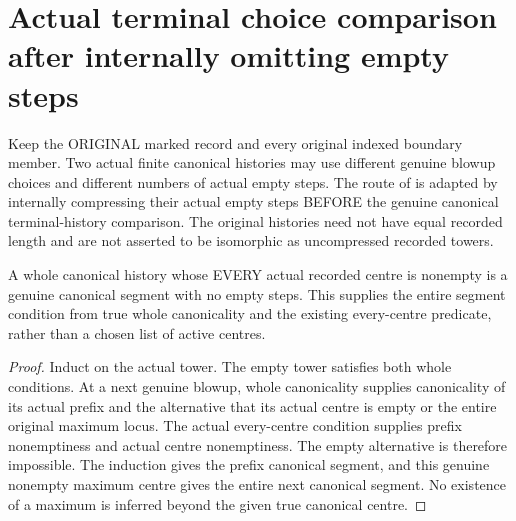 \section{Actual terminal choice comparison after internally omitting empty steps}

Keep the ORIGINAL marked record and every original indexed boundary member.
Two actual finite canonical histories may use different genuine blowup
choices and different numbers of actual empty steps. The route of
\cite{wlodarczyk05-hironaka,bierstone-milman08-functoriality} is adapted by
internally compressing their actual empty steps BEFORE the genuine
canonical terminal-history comparison. The original histories need not
have equal recorded length and are not asserted to be isomorphic as
uncompressed recorded towers.

\begin{lemma}
\label{hir:original-actual-nonempty-canonical-segment}
\leanok
A whole canonical history whose EVERY actual recorded centre is nonempty
is a genuine canonical segment with no empty steps. This supplies the
entire segment condition from true whole canonicality and the existing
every-centre predicate, rather than a chosen list of active centres.
\end{lemma}
\begin{proof}
Induct on the actual tower. The empty tower satisfies both whole conditions.
At a next genuine blowup, whole canonicality supplies canonicality of its
actual prefix and the alternative that its actual centre is empty or the
entire original maximum locus. The actual every-centre condition supplies
prefix nonemptiness and actual centre nonemptiness. The empty alternative
is therefore impossible. The induction gives the prefix canonical segment,
and this genuine nonempty maximum centre gives the entire next canonical
segment. No existence of a maximum is inferred beyond the given true
canonical centre.
\end{proof}

